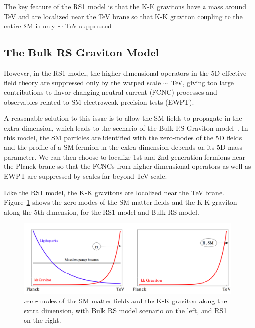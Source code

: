 The key feature of the RS1 model is that the K-K gravitons have a mass around TeV and are localized near the TeV brane so that K-K graviton coupling to the entire SM is only $\sim$ TeV suppressed
\subsection{The Bulk RS Graviton Model}
However, in the RS1 model, the higher-dimensional operators in the 5D effective field theory are suppressed only by the warped scale $\sim$ TeV, giving too large contributions to flavor-changing neutral current (FCNC) processes and observables related to SM electroweak precision tests (EWPT).

\vspace{0.3cm}
A reasonable solution to this issue is to allow the SM fields to propagate in the extra dimension, which leads to the scenario of the Bulk RS Graviton model~\cite{intro_bulkref1,intro_bulkref2,intro_bulkref3}. In this model, the SM particles are identified with the zero-modes of the 5D fields and the profile of a SM fermion in the extra dimension depends on its 5D mass parameter. We can then choose to localize 1st and 2nd generation fermions near the Planck brane so that the FCNCs from higher-dimensional operators as well as EWPT are suppressed by scales far beyond TeV scale.

\vspace{0.3cm}
Like the RS1 model, the K-K gravitons are locolized near the TeV brane. Figure~\ref{fig:intro_rsandbulk} shows the zero-modes of the SM matter fields and the K-K graviton along the 5th dimension, for the RS1 model and Bulk RS model.
\begin{figure}[htbp]
\begin{center}
\includegraphics[width=0.9\linewidth]{figures/intro_rsandbulk.png}
\caption{zero-modes of the SM matter fields and the K-K graviton along the extra dimension, with Bulk RS model scenario on the left, and RS1 on the right.}
\label{fig:intro_rsandbulk}
\end{center}
\end{figure}

